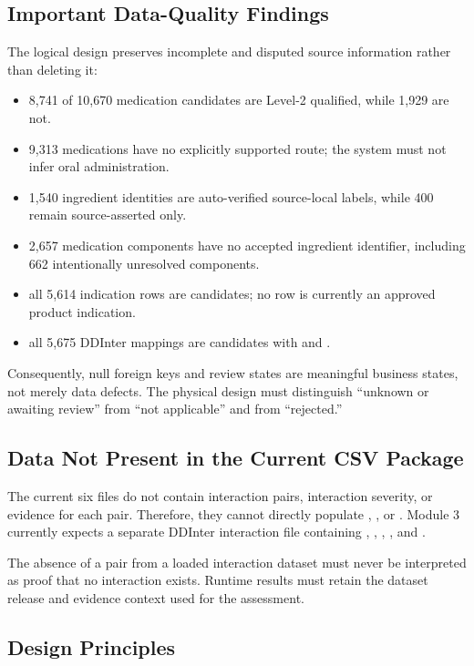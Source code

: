 \subsection{Important Data-Quality Findings}

The logical design preserves incomplete and disputed source information rather than deleting it:
\begin{itemize}
  \item 8,741 of 10,670 medication candidates are Level-2 qualified, while 1,929 are not.
  \item 9,313 medications have no explicitly supported route; the system must not infer oral administration.
  \item 1,540 ingredient identities are auto-verified source-local labels, while 400 remain source-asserted only.
  \item 2,657 medication components have no accepted ingredient identifier, including 662 intentionally unresolved components.
  \item all 5,614 indication rows are candidates; no row is currently an approved product indication.
  \item all 5,675 DDInter mappings are candidates with  and .
\end{itemize}

Consequently, null foreign keys and review states are meaningful business states, not merely data defects. The physical design must distinguish ``unknown or awaiting review'' from ``not applicable'' and from ``rejected.''

\subsection{Data Not Present in the Current CSV Package}

The current six files do not contain interaction pairs, interaction severity, or evidence for each pair. Therefore, they cannot directly populate , , or . Module 3 currently expects a separate DDInter interaction file containing , , , , and .

The absence of a pair from a loaded interaction dataset must never be interpreted as proof that no interaction exists. Runtime results must retain the dataset release and evidence context used for the assessment.

\subsection{Design Principles}

